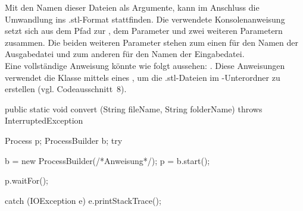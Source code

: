 Mit den Namen dieser Dateien als Argumente, kann im Anschluss die Umwandlung ins .stl-Format stattfinden.
Die verwendete Konsolenanweisung setzt sich aus dem Pfad zur , dem Parameter  und zwei weiteren Parametern zusammen. 
Die beiden weiteren Parameter stehen zum einen für den Namen der Ausgabedatei und zum anderen für den Namen der Eingabedatei. \\
Eine vollständige Anweisung könnte wie folgt aussehen:  .
Diese Anweisungen verwendet die Klasse  mittels eines , um die .stl-Dateien im -Unterordner zu erstellen (vgl. Codeausschnitt~8). \\

\begin{code}
	public static void convert (String fileName, String folderName) throws InterruptedException {
		Process p;
		ProcessBuilder b;
		try {
			b = new ProcessBuilder(/*Anweisung*/);
			p = b.start();
						
			p.waitFor();
		} catch (IOException e) {
			e.printStackTrace();
		}
	}
\end{code}
